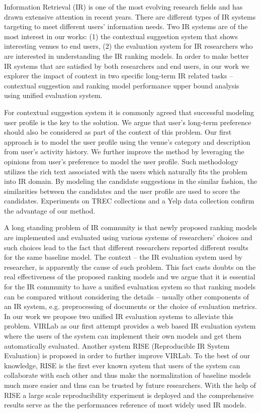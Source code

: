 %
%
Information Retrieval (IR) is one of the most evolving research fields 
and has drawn extensive attention in recent years. 
There are different types of IR systems targeting to meet 
different users' information needs. Two IR systems are of the most interest 
in our works: (1) the contextual suggestion system that shows interesting venues to end users, (2) the evaluation system for IR researchers who are 
interested in understanding the IR ranking models.
In order to make better IR systems that are satisfied by both researchers 
and end users, in our work we explorer the impact of 
context in two specific long-term IR related tasks -- contextual suggestion 
and ranking model performance upper bound analysis using unified evaluation 
system.

For contextual suggestion system it is commonly agreed that successful 
modeling user profile is the key to the solution. We argue that user's 
long-term preference should also be considered as part of the context of 
this problem. 
Our first approach is to model the user profile using the venue's category 
and description from user's activity history. We further improve the 
method by leveraging the opinions from user's preference to model the 
user profile. Such methodology utilizes the rich text associated 
with the users which naturally fits the problem into IR domain. 
By modeling the candidate suggestions in the similar fashion, 
the similarities between the candidates and the user profile are used to 
score the candidates. Experiments on TREC collections and a Yelp data 
collection confirm the advantage of our method.

A long standing problem of IR community is that newly proposed ranking models 
are implemented and evaluated using various systems of researchers' choices 
and such choices lead to the fact that different researchers reported 
different results for the same baseline model. 
The context -- the IR evaluation system used by researcher, 
is apparently the cause of such problem. This fact casts doubts on the real 
effectiveness of the proposed ranking models and we argue that it is 
essential for the IR community to have a unified evaluation system so that 
ranking models can be compared without considering the details -- usually 
other components of an IR system, e.g. preprocessing of documents 
or the choice of evaluation metrics. 
In our work we propose two unified IR evaluation systems to alleviate this problem. 
VIRLab as our first attempt provides a web based IR evaluation system 
where the users of the system can implement their own models and get them 
automatically evaluated.
Another system RISE (Reproducible IR System Evaluation) is proposed in order 
to further improve VIRLab.
To the best of our knowledge, RISE is the first ever known system that users 
of the system can collaborate with each other and thus make the 
normalization of baseline models much more easier and thus can be trusted 
by future researchers. 
With the help of RISE a large scale reproducibility experiment is deployed 
and the comprehensive results serve as the the performances reference of 
most widely used IR models.

